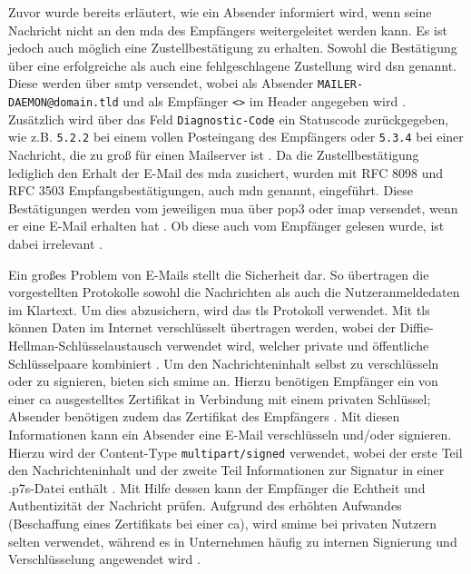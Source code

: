 Zuvor wurde bereits erläutert, wie ein Absender informiert wird, wenn seine Nachricht nicht an den \acrshort{mda} des Empfängers weitergeleitet werden kann. Es ist jedoch auch möglich eine Zustellbestätigung zu erhalten. Sowohl die Bestätigung über eine erfolgreiche als auch eine fehlgeschlagene Zustellung wird \acrfull{dsn} genannt. Diese werden über \acrshort{smtp} versendet, wobei als Absender \texttt{MAILER-DAEMON@domain.tld} und als Empfänger \texttt{<>} im Header angegeben wird \citep[S. 19 ff.]{RFC3461}. Zusätzlich wird über das Feld \texttt{Diagnostic-Code} ein Statuscode zurückgegeben, wie z.B. \texttt{5.2.2} bei einem vollen Posteingang des Empfängers oder \texttt{5.3.4} bei einer Nachricht, die zu groß für einen Mailserver ist \citep[S. 7 ff.]{RFC3463}. Da die Zustellbestätigung lediglich den Erhalt der E-Mail des \acrshort{mda} zusichert, wurden mit RFC 8098 und RFC 3503 Empfangsbestätigungen, auch \acrfull{mdn} genannt, eingeführt. Diese Bestätigungen werden vom jeweiligen \acrshort{mua} über \acrshort{pop3} oder \acrshort{imap} versendet, wenn er eine E-Mail erhalten hat \citep[S. 3 f.]{RFC3503}. Ob diese auch vom Empfänger gelesen wurde, ist dabei irrelevant \citep[S. 30 f.]{RFC8098}.

Ein großes Problem von E-Mails stellt die Sicherheit dar. So übertragen die vorgestellten Protokolle sowohl die Nachrichten als auch die Nutzeranmeldedaten im Klartext. Um dies abzusichern, wird das \acrfull{tls} Protokoll verwendet. Mit \acrshort{tls} können Daten im Internet verschlüsselt übertragen werden, wobei der Diffie-Hellman-Schlüsselaustausch verwendet wird, welcher private und öffentliche Schlüsselpaare kombiniert \citep[S. 95 f.]{RFC8446}. Um den Nachrichteninhalt selbst zu verschlüsseln oder zu signieren, bieten sich \acrfull{smime} an. Hierzu benötigen Empfänger ein von einer \acrfull{ca} ausgestelltes Zertifikat in Verbindung mit einem privaten Schlüssel; Absender benötigen zudem das Zertifikat des Empfängers \citep[S. 5 ff.]{RFC8551}. Mit diesen Informationen kann ein Absender eine E-Mail verschlüsseln und/oder signieren. Hierzu wird der Content-Type \texttt{multipart/signed} verwendet, wobei der erste Teil den Nachrichteninhalt und der zweite Teil Informationen zur Signatur in einer .p7s-Datei enthält \citep[S. 30 ff.]{RFC8551}. Mit Hilfe dessen kann der Empfänger die Echtheit und Authentizität der Nachricht prüfen. Aufgrund des erhöhten Aufwandes (Beschaffung eines Zertifikats bei einer \acrshort{ca}), wird \acrshort{smime} bei privaten Nutzern selten verwendet, während es in Unternehmen häufig zu internen Signierung und Verschlüsselung angewendet wird \citep[S. 266]{Kappes2013}.


